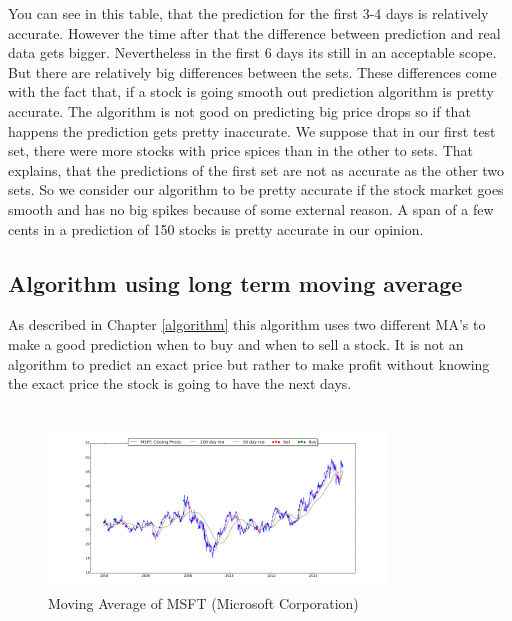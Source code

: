 \documentclass[conference]{IEEEtran}
\begin{document}
You can see in this table, that the prediction for the first 3-4 days is relatively accurate. However the time after that the difference between prediction and real data gets bigger. Nevertheless in the first 6 days its still in an acceptable scope. But there are relatively big differences between the sets. These differences come with the fact that, if a stock is going smooth out prediction algorithm is pretty accurate. The algorithm is not good on predicting big price drops so if that happens the prediction gets pretty inaccurate. We suppose that in our first test set, there were more stocks with price spices than in the other to sets. That explains, that the predictions of the first set are not as accurate as the other two sets. So we consider our algorithm to be pretty accurate if the stock market goes smooth and has no big spikes because of some external reason. A span of a few cents in a prediction of 150 stocks is pretty accurate in our opinion.

\subsection{Algorithm using long term moving average}

As described in Chapter \ref{algorithm} this algorithm uses two different MA's to make a good prediction when to buy and when to sell a stock. It is not an algorithm to predict an exact price but rather to make profit without knowing the exact price the stock is going to have the next days.
\\
\\
\begin{figure}[!h]
  \includegraphics{MSFT_MA}
  \caption{Moving Average of MSFT (Microsoft Corporation)}
  \label{fig:MSFT_MA}
\end{figure}
\end{document}
